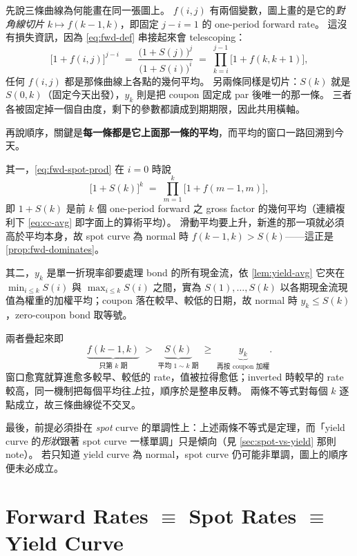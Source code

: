 \suppstart
\begin{remark}
	先說三條曲線為何能畫在同一張圖上。
	$f(i,j)$ 有兩個變數，圖上畫的是它的\emph{對角線切片} $k\mapsto f(k-1,k)$，即固定 $j-i=1$ 的 one-period forward rate。
	這沒有損失資訊，因為 \eqref{eq:fwd-def} 串接起來會 telescoping：
	\[
		\bigl[1+f(i,j)\bigr]^{j-i}
		\;=\; \frac{\bigl(1+S(j)\bigr)^{j}}{\bigl(1+S(i)\bigr)^{i}}
		\;=\; \prod_{k=i}^{j-1}\bigl[1+f(k,k+1)\bigr] ,
	\]
	任何 $f(i,j)$ 都是那條曲線上各點的幾何平均。
	另兩條同樣是切片：$S(k)$ 就是 $S(0,k)$（固定今天出發），$y_{k}$ 則是把 coupon 固定成 par 後唯一的那一條。
	三者各被固定掉一個自由度，剩下的參數都讀成到期期限，因此共用橫軸。

	再說順序，關鍵是\textbf{每一條都是它上面那一條的平均}，而平均的窗口一路回溯到今天。

	其一，\eqref{eq:fwd-spot-prod} 在 $i=0$ 時說
	\[
		\bigl[1+S(k)\bigr]^{k} \;=\; \prod_{m=1}^{k}\bigl[1+f(m-1,m)\bigr] ,
	\]
	即 $1+S(k)$ 是前 $k$ 個 one-period forward 之 gross factor 的幾何平均（連續複利下 \eqref{eq:cc-avg} 即字面上的算術平均）。
	滑動平均要上升，新進的那一項就必須高於平均本身，故 spot curve 為 normal 時 $f(k-1,k)>S(k)$——這正是 \autoref{prop:fwd-dominates}。

	其二，$y_{k}$ 是單一折現率卻要處理 bond 的所有現金流，依 \autoref{lem:yield-avg} 它夾在 $\min_{i\le k}S(i)$ 與 $\max_{i\le k}S(i)$ 之間，實為 $S(1),\ldots,S(k)$ 以各期現金流現值為權重的加權平均；coupon 落在較早、較低的日期，故 normal 時 $y_{k}\le S(k)$，zero-coupon bond 取等號。

	兩者疊起來即
	\[
		\underbrace{f(k-1,k)}_{\text{只第 }k\text{ 期}}
		\;>\; \underbrace{S(k)}_{\text{平均 }1\sim k\text{ 期}}
		\;\ge\; \underbrace{y_{k}}_{\text{再按 coupon 加權}} .
	\]
	窗口愈寬就算進愈多較早、較低的 rate，值被拉得愈低；inverted 時較早的 rate 較高，同一機制把每個平均往\emph{上}拉，順序於是整串反轉。
	兩條不等式對每個 $k$ 逐點成立，故三條曲線從不交叉。

	最後，前提必須掛在 \emph{spot} curve 的單調性上：上述兩條不等式是定理，而「yield curve 的\emph{形狀}跟著 spot curve 一樣單調」只是傾向（見 \autoref{sec:spot-vs-yield} 那則 note）。
	若只知道 yield curve 為 normal，spot curve 仍可能非單調，圖上的順序便未必成立。
\end{remark}
\suppend

\section{Forward Rates \texorpdfstring{$\equiv$}{=} Spot Rates \texorpdfstring{$\equiv$}{=} Yield Curve}
\label{sec:fwd-equiv}

